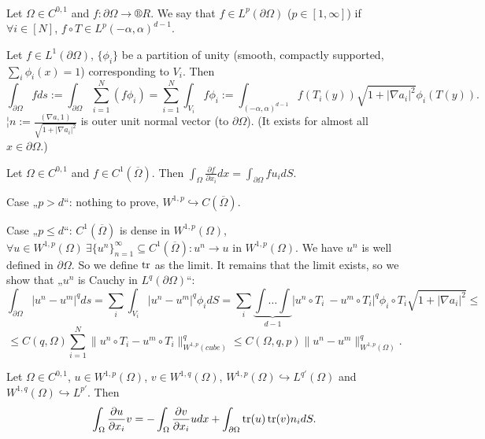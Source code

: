 \documentclass[12pt]{article}					%
\begin{document}
\begin{dukaz}
	\ 

	\begin{definicein}
		Let $\Omega \in C^{0, 1}$ and $f: \partial \Omega \rightarrow ®R$. We say that $f \in L^p(\partial \Omega)$ ($p \in [1, ∞]$) if $\forall i \in [N]$, $f \circ T \in L^p(-\alpha, \alpha)^{d - 1}$.
	\end{definicein}

	\begin{definicein}
		Let $f \in L^1(\partial \Omega)$, $\{\phi_i\}$ be a partition of unity (smooth, compactly supported, $\sum_i \phi_i(x) = 1$) corresponding to $V_i$. Then
		$$ \int_{\partial \Omega} f ds := \int_{\partial \Omega} \sum_{i=1}^N (f \phi_i) = \sum_{i=1}^N \int_{V_i} f \phi_i := \int_{(-\alpha, \alpha)^{d - 1}} f(T_i(y)) \sqrt{1 + |\nabla a_i|^2} \phi_i(T(y)). $$
		$¦n := \frac{(\nabla a, 1)}{\sqrt{1 + |\nabla a_i|^2}}$ is outer unit normal vector (to $\partial \Omega$). (It exists for almost all $x \in \partial\Omega$.)
	\end{definicein}

	\begin{lemmain}[IBP]
		Let $\Omega \in C^{0, 1}$ and $f \in C^1(\overline{\Omega})$. Then $\int_\Omega \frac{\partial f}{\partial x_i} dx = \int_{\partial \Omega} f u_i dS$.
	\end{lemmain}
\end{dukaz}

\begin{dukaz}
	Case „$p > d$“: nothing to prove, $W^{1, p} \hookrightarrow C(\overline{\Omega})$.

	Case „$p ≤ d$“: $C^1(\overline{\Omega})$ is dense in $W^{1, p}(\Omega)$, $\forall u \in W^{1, p}(\Omega)\ \exists \{u^n\}_{n=1}^∞ \subseteq C^1(\overline{\Omega}): u^n \rightarrow u$ in $W^{1, p}(\Omega)$. We have $u^n$ is well defined in $\partial \Omega$. So we define $\operatorname{tr}$ as the limit. It remains that the limit exists, so we show that „$u^n$ is Cauchy in $L^q(\partial \Omega)$“:
	$$ \int_{\partial \Omega} |u^n - u^m|^q ds = \sum_i \int_{V_i} |u^n - u^m|^q \phi_i dS = \sum_i \underbrace{\int…\int}_{d-1} |u^n∘T_i\ - u^m∘T_i|^q \phi_i ∘ T_i \sqrt{1 + |\nabla a_i|^2} ≤ $$
	$$ ≤ C(q, \Omega) \sum_{i=1}^N \|u^n ∘ T_i - u^m ∘ T_i\|_{W^{1, p}(cube)}^q ≤ C(\Omega, q, p) \|u^n - u^m\|^q_{W^{1, p}(\Omega)}. $$
\end{dukaz}

\begin{veta}
	Let $\Omega \in C^{0, 1}$, $u \in W^{1, p}(\Omega)$, $v \in W^{1, q}(\Omega)$, $W^{1, p}(\Omega) \hookrightarrow L^{q'}(\Omega)$ and $W^{1, q}(\Omega) \hookrightarrow L^{p'}$. Then
	$$ \int_\Omega \frac{\partial u}{\partial x_i} v = - \int_\Omega \frac{\partial v}{\partial x_i} u dx + \int_{\partial \Omega} \operatorname{tr}(u) \operatorname{tr}(v) n_i dS. $$
\end{veta}
\end{document}
